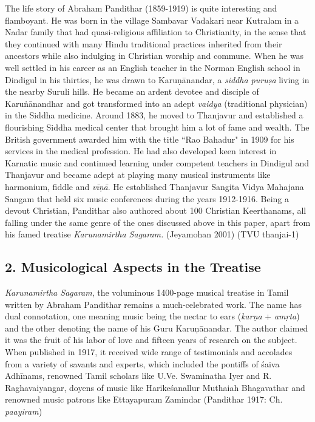 The life story of Abraham Pandithar (1859-1919) is quite interesting and flamboyant. He was born in the village Sambavar Vadakari near Kutralam in a Nadar family that had quasi-religious affiliation to Christianity, in the sense that they continued with many Hindu traditional practices inherited from their ancestors while also indulging in Christian worship and commune. When he was well settled in his career as an English teacher in the Norman English school in Dindigul in his thirties, he was drawn to Karuṇānandar, a \textit{siddha puruṣa} living in the nearby Suruli hills. He became an ardent devotee and disciple of Karuṅānandhar and got transformed into an adept \textit{vaidya} (traditional physician) in the Siddha medicine. Around 1883, he moved to Thanjavur and established a flourishing Siddha medical center that brought him a lot of fame and wealth. The British government awarded him with the title ``Rao Bahadur" in 1909 for his services in the medical profession. He had also developed keen interest in Karnatic music and continued learning under competent teachers in Dindigul and Thanjavur and became adept at playing many musical instruments like harmonium, fiddle and \textit{vīṇā}. He established Thanjavur Sangita Vidya Mahajana Sangam that held six music conferences during the years 1912-1916. Being a devout Christian, Pandithar also authored about 100 Christian Keerthanams, all falling under the same genre of the ones discussed above in this paper, apart from his famed treatise \textit{Karunamirtha Sagaram.} (Jeyamohan 2001) (TVU thanjai-1)

\vspace{-.2cm}

\subsection*{2. Musicological Aspects in the Treatise}

\vspace{-.2cm}

\textit{Karunamirtha Sagaram}, the voluminous 1400-page musical treatise in Tamil written by Abraham Pandithar remains a much-celebrated work. The name has dual connotation, one meaning music being the nectar to ears (\textit{karṇa} + \textit{amṛta}) and the other denoting the name of his Guru Karuṇānandar. The author claimed it was the fruit of his labor of love and fifteen years of research on the subject. When published in 1917, it received wide range of testimonials and accolades from a variety of savants and experts, which included the pontiffs of śaiva Adhīnams, renowned Tamil scholars like U.Ve. Swaminatha Iyer and R. Raghavaiyangar, doyens of music like Harikeśanallur Muthaiah Bhagavathar and renowned music patrons like Ettayapuram Zamindar (Pandithar 1917: Ch. \textit{paayiram})


